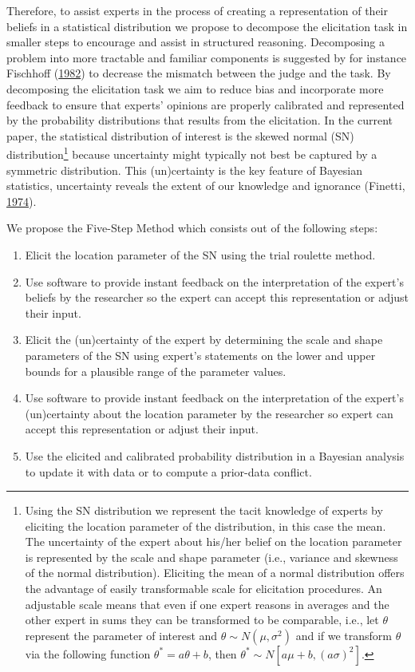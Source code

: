 \documentclass[openright,titlepage,12pt,a4paper]{book}
\providecommand{\tightlist}{%
  \setlength{\itemsep}{0pt}\setlength{\parskip}{0pt}}
\let\rmarkdownfootnote\footnote%
\def\footnote{\protect\rmarkdownfootnote}
\begin{document}
Therefore, to assist experts in the process of creating a representation of their beliefs in a statistical distribution we propose to decompose the elicitation task in smaller steps to encourage and assist in structured reasoning. Decomposing a problem into more tractable and familiar components is suggested by for instance Fischhoff (\protect\hyperlink{ref-fischhoff_debiasing_1982}{1982}) to decrease the mismatch between the judge and the task. By decomposing the elicitation task we aim to reduce bias and incorporate more feedback to ensure that experts' opinions are properly calibrated and represented by the probability distributions that results from the elicitation. In the current paper, the statistical distribution of interest is the skewed normal (SN) distribution\footnote{Using the SN distribution we represent the tacit knowledge of experts by eliciting the location parameter of the distribution, in this case the mean. The uncertainty of the expert about his/her belief on the location parameter is represented by the scale and shape parameter (i.e., variance and skewness of the normal distribution). Eliciting the mean of a normal distribution offers the advantage of easily transformable scale for elicitation procedures. An adjustable scale means that even if one expert reasons in averages and the other expert in sums they can be transformed to be comparable, i.e., let \(\theta\) represent the parameter of interest and \(\theta \sim N(\mu, \sigma^2)\) and if we transform \(\theta\) via the following function \(\theta^* = a\theta+b\), then \(\theta^* \sim N[a\mu+b,(a\sigma)^2]\).} because uncertainty might typically not best be captured by a symmetric distribution. This (un)certainty is the key feature of Bayesian statistics, uncertainty reveals the extent of our knowledge and ignorance (Finetti, \protect\hyperlink{ref-de_finetti_theory_1974}{1974}).

We propose the Five-Step Method which consists out of the following steps:

\begin{enumerate}
\def\labelenumi{\arabic{enumi}.}
\tightlist
\item
  Elicit the location parameter of the SN using the trial roulette method.
\item
  Use software to provide instant feedback on the interpretation of the expert's beliefs by the researcher so the expert can accept this representation or adjust their input.
\item
  Elicit the (un)certainty of the expert by determining the scale and shape parameters of the SN using expert's statements on the lower and upper bounds for a plausible range of the parameter values.
\item
  Use software to provide instant feedback on the interpretation of the expert's (un)certainty about the location parameter by the researcher so expert can accept this representation or adjust their input.
\item
  Use the elicited and calibrated probability distribution in a Bayesian analysis to update it with data or to compute a prior-data conflict.
\end{enumerate}
\end{document}
